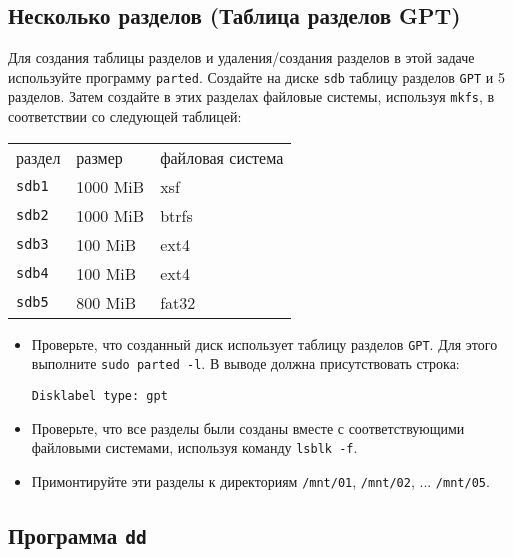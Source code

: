 \documentclass{article}
\begin{document}
\subsection{Несколько разделов (Таблица разделов GPT)}
Для создания таблицы разделов и удаления/создания разделов в этой задаче используйте программу \texttt{parted}. Создайте на диске \texttt{sdb} таблицу разделов \texttt{GPT} и 5 разделов. Затем создайте в этих разделах файловые системы, используя \texttt{mkfs}, в соответствии со следующей таблицей:
\begin{center}
\begin{tabular}{lll}
 раздел & размер  	& файловая система   \\
 \texttt{sdb1} 	& 1000 MiB 		& xsf   \\
 \texttt{sdb2} 	& 1000 MiB 		& btrfs \\
 \texttt{sdb3} 	& 100 MiB 		& ext4 \\
 \texttt{sdb4} 	& 100 MiB 		& ext4 \\
 \texttt{sdb5} 	& 800 MiB 		& fat32 \\
\end{tabular}
\end{center}

\begin{itemize}
\item Проверьте, что созданный диск использует таблицу разделов \texttt{GPT}. Для этого выполните \texttt{sudo parted -l}. В выводе должна присутствовать строка:
\begin{lstlisting}
Disklabel type: gpt
\end{lstlisting}
\item Проверьте, что все разделы были созданы вместе с соответствующими файловыми системами, используя команду \texttt{lsblk -f}.
\item Примонтируйте эти разделы к директориям \texttt{/mnt/01}, \texttt{/mnt/02}, ... \texttt{/mnt/05}.
\end{itemize}








\subsection{Программа \texttt{dd}}
\end{document}
